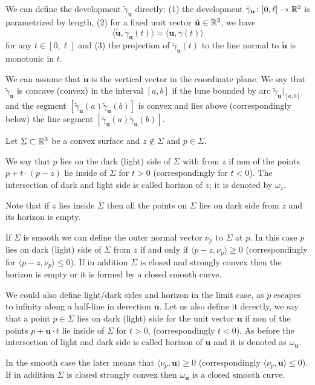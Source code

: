 \documentclass[a4paper,10pt]{amsart}
\begin{document}
We can define the development $\tilde\gamma_{\bm{u}}$ directly:
(1) the development $\tilde\gamma_{\bm{u}}\colon[0,\ell]\to \mathbb{R}^2$
is parametrized by length,
(2) for a fixed unit vector $\tilde{\bm{u}}\in\mathbb{R}^2$,
we have
\[\langle \tilde{\bm{u}},\tilde\gamma_{\bm{u}}(t)\rangle
=
\langle  \bm{u},\gamma(t)\rangle\]
for any $t\in [0,\ell]$
and 
(3) the projection of $\tilde\gamma_{\bm{u}}(t)$ to the line normal to $\tilde{\bm{u}}$
is monotonic in $t$.

We can assume that $\tilde{\bm{u}}$ is the vertical vector in the coordinate plane.
We say that $\tilde\gamma_{\bm{u}}$ is concave (convex) in the interval $[a,b]$ 
if the lune bounded by arc $\tilde\gamma_{\bm{u}}|_{[a,b]}$
and the segment $[\tilde\gamma_{\bm{u}}(a)\tilde\gamma_{\bm{u}}(b)]$
is convex and lies above (correspondingly below) the line segment $[\tilde\gamma_{\bm{u}}(a)\tilde\gamma_{\bm{u}}(b)]$.
 
Let $\Sigma\subset\mathbb{R}^3$ be a convex surface 
and $z\notin\Sigma$ and $p\in\Sigma$.

We say that $p$ lies on the dark (light) side of $\Sigma$ with from $z$ 
if non of the points $p+t\cdot(p-z)$ lie inside of $\Sigma$ for $t>0$ (correspondingly for $t<0$).
The intersection of dark and light side is called horizon of $z$;
it is denoted by $\omega_z$.

Note that if $z$ lies inside $\Sigma$ then all the points on $\Sigma$ lies on dark side from $z$ and its horizon is empty.

If $\Sigma$ is smooth we can define the outer normal vector $\nu_p$ to $\Sigma$ at $p$.
In this case $p$ lies on dark (light) side of $\Sigma$ from $z$
if and only if $\langle p-z,\nu_p\rangle\ge 0$
(correspondingly for $\langle p-z,\nu_p\rangle\le 0$).
If in addition $\Sigma$ is closed and strongly convex then the horizon is empty or it is formed by a closed smooth curve.

We could also define light/dark sides and horizon in the limit case,
as $p$ escapes to infinity along a half-line in derection $\bm{u}$.
Let us also define it derectly,
we say that a point $p\in\Sigma$ lies on dark (light) side for the unit vector $\bm{u}$ if non of the points $p+\bm{u}\cdot t$ lie inside of $\Sigma$ for $t>0$, (correspondingly $t<0$).
As before the intersection of light and dark side is called horizon of $\bm{u}$ and it is denoted as $\omega_{\bm{u}}$.

In the smooth case the later means that $\langle \nu_p,\bm{u}\rangle\ge 0$ (correspondingly $\langle \nu_p,\bm{u}\rangle\le 0$).
If in addition $\Sigma$ is closed strongly convex then $\omega_{\bm{u}}$ is a closed smooth curve.
\end{document}
